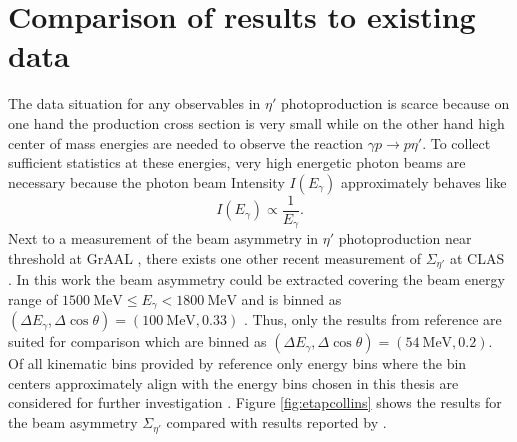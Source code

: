 \section{Comparison of results to existing data}
The data situation for any observables in $\eta'$ photoproduction is scarce because on one hand the production cross section is very small while on the other hand high center of mass energies are needed to observe the reaction $\gamma p \to p\eta'$.  To collect sufficient statistics at these energies, very high energetic photon beams are necessary because the photon beam Intensity $I(E_\gamma)$ approximately behaves like \cite{leo}
\begin{equation}
	I(E_\gamma)\propto\frac{1}{E_\gamma}.
	\label{eq:int}
\end{equation} 
Next to a measurement of the beam asymmetry in $\eta'$ photoproduction near threshold at GrAAL \cite{thresh}, there exists one other recent measurement of $\Sigma_{\eta'}$ at CLAS \cite{collins}. In this work the beam asymmetry could be extracted covering the beam energy range of $\SI{1500}{\mega\eV}\leq E_\gamma<\SI{1800}{\mega\eV}$ and is binned as $\left(\Delta E_\gamma,\Delta\cos\theta\right)=\left(\SI{100}{\mega\eV},0.33\right)$ . Thus, only the results from reference \cite{collins} are suited for comparison which are binned as $\left(\Delta E_\gamma,\Delta\cos\theta\right)=\left(\SI{54}{\mega\eV},0.2\right)$. Of all kinematic bins provided by reference \cite{collins} only energy bins where the bin centers approximately align with the energy bins chosen in this thesis are considered for further investigation .
Figure \ref{fig:etapcollins} shows the results for the beam asymmetry $\Sigma_{\eta'}$ compared with results reported by \cite{collins}.
